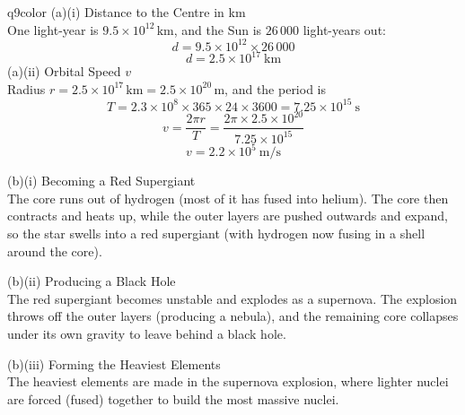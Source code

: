\documentclass[11pt,a4paper]{article}
\begin{document}
\begin{ansbox}{q9color}
(a)(i) Distance to the Centre in km\\[4pt]
One light-year is $9.5 \times 10^{12}\,\mathrm{km}$, and the Sun is $26\,000$ light-years out:
\[
d = 9.5 \times 10^{12} \times 26\,000
\]
\[
d = \boxed{2.5 \times 10^{17}\ \mathrm{km}}
\]
\clearpage
\vspace{4pt}
(a)(ii) Orbital Speed $v$\\[4pt]
Radius $r = 2.5 \times 10^{17}\,\mathrm{km} = 2.5 \times 10^{20}\,\mathrm{m}$, and the period is
\[
T = 2.3 \times 10^{8} \times 365 \times 24 \times 3600 = 7.25 \times 10^{15}\ \mathrm{s}
\]
\[
v = \frac{2\pi r}{T} = \frac{2\pi \times 2.5 \times 10^{20}}{7.25 \times 10^{15}}
\]
\[
v = \boxed{2.2 \times 10^{5}\ \mathrm{m/s}}
\]

\vspace{4pt}
(b)(i) Becoming a Red Supergiant\\[4pt]
The core runs out of hydrogen (most of it has fused into helium). The core then contracts and heats up, while the outer layers are pushed outwards and expand, so the star swells into a red supergiant (with hydrogen now fusing in a shell around the core).

\vspace{4pt}
(b)(ii) Producing a Black Hole\\[4pt]
The red supergiant becomes unstable and explodes as a supernova. The explosion throws off the outer layers (producing a nebula), and the remaining core collapses under its own gravity to leave behind a black hole.

\vspace{4pt}
(b)(iii) Forming the Heaviest Elements\\[4pt]
The heaviest elements are made in the supernova explosion, where lighter nuclei are forced (fused) together to build the most massive nuclei.
\end{ansbox}
\end{document}
